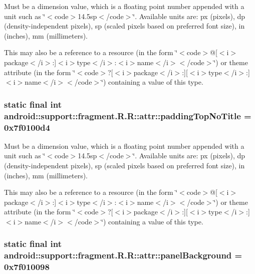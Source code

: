 Must be a dimension value, which is a floating point number appended with a unit such as \char`\"{}$<$code$>$14.5sp$<$/code$>$\char`\"{}. Available units are: px (pixels), dp (density-independent pixels), sp (scaled pixels based on preferred font size), in (inches), mm (millimeters). 

This may also be a reference to a resource (in the form \char`\"{}$<$code$>$@\mbox{[}$<$i$>$package$<$/i$>$:\mbox{]}$<$i$>$type$<$/i$>$:$<$i$>$name$<$/i$>$$<$/code$>$\char`\"{}) or theme attribute (in the form \char`\"{}$<$code$>$?\mbox{[}$<$i$>$package$<$/i$>$:\mbox{]}\mbox{[}$<$i$>$type$<$/i$>$:\mbox{]}$<$i$>$name$<$/i$>$$<$/code$>$\char`\"{}) containing a value of this type. \hypertarget{classandroid_1_1support_1_1fragment_1_1_r_1_1attr_8f50be2ffdf9c8cdd814cb7c765229b7}{
\subsubsection[{paddingTopNoTitle}]{\setlength{\rightskip}{0pt plus 5cm}static final int android::support::fragment.R.R::attr::paddingTopNoTitle = 0x7f0100d4}}
\label{classandroid_1_1support_1_1fragment_1_1_r_1_1attr_8f50be2ffdf9c8cdd814cb7c765229b7}


Must be a dimension value, which is a floating point number appended with a unit such as \char`\"{}$<$code$>$14.5sp$<$/code$>$\char`\"{}. Available units are: px (pixels), dp (density-independent pixels), sp (scaled pixels based on preferred font size), in (inches), mm (millimeters). 

This may also be a reference to a resource (in the form \char`\"{}$<$code$>$@\mbox{[}$<$i$>$package$<$/i$>$:\mbox{]}$<$i$>$type$<$/i$>$:$<$i$>$name$<$/i$>$$<$/code$>$\char`\"{}) or theme attribute (in the form \char`\"{}$<$code$>$?\mbox{[}$<$i$>$package$<$/i$>$:\mbox{]}\mbox{[}$<$i$>$type$<$/i$>$:\mbox{]}$<$i$>$name$<$/i$>$$<$/code$>$\char`\"{}) containing a value of this type. \hypertarget{classandroid_1_1support_1_1fragment_1_1_r_1_1attr_6ef0e91ad1f77cd2094d44040faebe7a}{
\subsubsection[{panelBackground}]{\setlength{\rightskip}{0pt plus 5cm}static final int android::support::fragment.R.R::attr::panelBackground = 0x7f010098}}
\label{classandroid_1_1support_1_1fragment_1_1_r_1_1attr_6ef0e91ad1f77cd2094d44040faebe7a}


